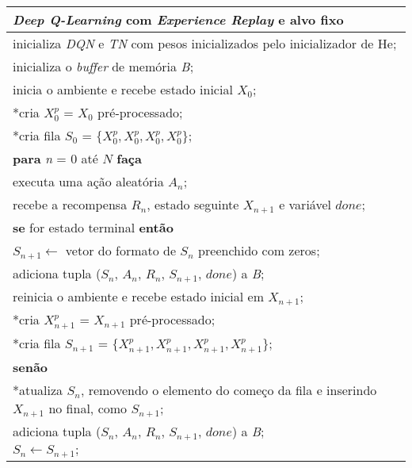 \begin{tabular}{l}

\hline
\textit{Deep Q-Learning} com \textit{Experience Replay} e alvo fixo\\
\hline

inicializa \textit{DQN} e \textit{TN} com pesos inicializados pelo inicializador de He;\\
inicializa o \textit{buffer} de memória \textit{B};\\
inicia o ambiente e recebe estado inicial $X_{0}$;\\
*cria $X^{p}_{0}$ = $X_{0}$ pré-processado;\\
*cria fila $S_{0}$ = $\{X^{p}_{0}, X^{p}_{0}, X^{p}_{0}, X^{p}_{0}\}$;\\
\textbf{para} \textit{n} = 0 até $N$ \textbf{faça}\\
\qquad executa uma ação aleatória $A_{n}$;\\
\qquad recebe a recompensa $R_{n}$, estado seguinte $X_{n+1}$ e variável $done$;\\
\qquad \textbf{se} for estado terminal \textbf{então}\\
\qquad \qquad $S_{n+1} \leftarrow$ vetor do formato de $S_{n}$ preenchido com zeros;\\
\qquad \qquad adiciona tupla ($S_{n}$, $A_{n}$, $R_{n}$, $S_{n+1}$, $done$) a \textit{B};\\
\qquad \qquad reinicia o ambiente e recebe estado inicial em $X_{n+1}$;\\
*\qquad \qquad cria $X^{p}_{n+1}$ = $X_{n+1}$ pré-processado;\\
*\qquad \qquad cria fila $S_{n+1}$ = $\{X^{p}_{n+1}, X^{p}_{n+1}, X^{p}_{n+1}, X^{p}_{n+1}\}$;\\
\qquad \textbf{senão}\\
*\qquad \qquad atualiza $S_{n}$, removendo o elemento do começo da fila e inserindo $X_{n+1}$ no final, como $S_{n+1}$;\\
\qquad \qquad adiciona tupla ($S_{n}$, $A_{n}$, $R_{n}$, $S_{n+1}$, $done$) a \textit{B};\\
\qquad \qquad $S_{n} \leftarrow S_{n+1};$ \\


\end{tabular}
